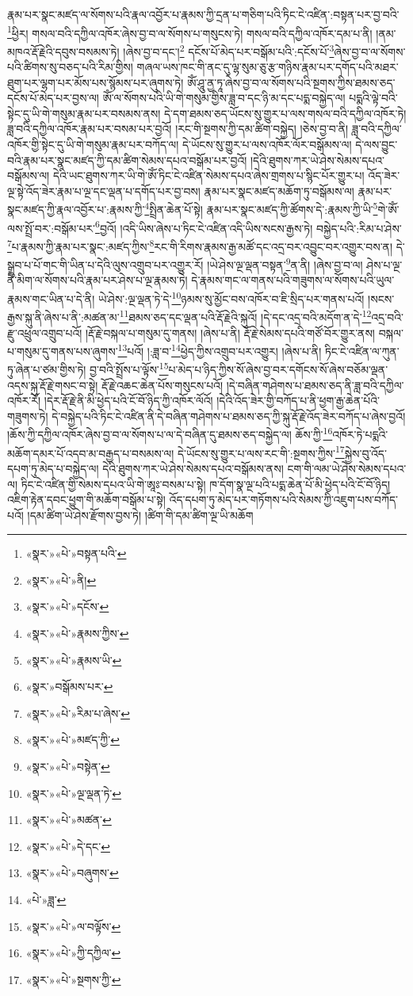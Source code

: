 རྣམ་པར་སྣང་མཛད་ལ་སོགས་པའི་རྣལ་འབྱོར་པ་རྣམས་ཀྱི་དྲན་པ་གཅིག་པའི་ཏིང་ངེ་འཛིན་:བསྟན་པར་བྱ་བའི་\footnote{«སྣར་»«པེ་»བསྟན་པའི་}ཕྱིར། གསལ་བའི་དཀྱིལ་འཁོར་ཞེས་བྱ་བ་ལ་སོགས་པ་གསུངས་ཏེ། གསལ་བའི་དཀྱིལ་འཁོར་དམ་པ་ནི། །ནམ་མཁའ་རྡོ་རྗེའི་དབུས་བསམས་ཏེ། །ཞེས་བྱ་བ་དང་།\footnote{«སྣར་»«པེ་»ནི།} དངོས་པོ་མེད་པར་བསྒོམ་པའི་:དངོས་པོ་\footnote{«སྣར་»«པེ་»དངོས་}ཞེས་བྱ་བ་ལ་སོགས་པའི་ཚིགས་སུ་བཅད་པའི་རིམ་གྱིས། གཞལ་ཡས་ཁང་གི་ནང་དུ་ལྷ་སུམ་ཅུ་རྩ་གཉིས་རྣམ་པར་དགོད་པའི་མཐར་ཐུག་པར་ལྷག་པར་མོས་པས་སྙོམས་པར་ཞུགས་ཏེ། ཨོཾ་ཤཱུ་ནྱ་ཏཱ་ཞེས་བྱ་བ་ལ་སོགས་པའི་སྔགས་ཀྱིས་ཐམས་ཅད་དངོས་པོ་མེད་པར་བྱས་ལ། ཨོཾ་ལ་སོགས་པའི་ཡི་གེ་གསུམ་གྱིས་ཟླ་བ་དང་ཉི་མ་དང་པདྨ་བསྐྱེད་ལ། པདྨའི་ལྟེ་བའི་སྟེང་དུ་ཡི་གེ་གསུམ་རྣམ་པར་བསམས་ནས། དེ་དག་ཐམས་ཅད་ཡོངས་སུ་གྱུར་པ་ལས་གསལ་བའི་དཀྱིལ་འཁོར་ཏེ། ཟླ་བའི་དཀྱིལ་འཁོར་རྣམ་པར་བསམ་པར་བྱའོ། །རང་གི་སྔགས་ཀྱི་དམ་ཚིག་བསྐྱེད། །ཅེས་བྱ་བ་ནི། ཟླ་བའི་དཀྱིལ་འཁོར་གྱི་སྟེང་དུ་ཡི་གེ་གསུམ་རྣམ་པར་བཀོད་ལ། དེ་ཡོངས་སུ་གྱུར་པ་ལས་འཁོར་ལོར་བསྒོམས་ལ། དེ་ལས་བྱུང་བའི་རྣམ་པར་སྣང་མཛད་ཀྱི་དམ་ཚིག་སེམས་དཔའ་བསྒོམ་པར་བྱའོ། །དེའི་ཐུགས་ཀར་ཡེ་ཤེས་སེམས་དཔའ་བསྒོམས་ལ། དེའི་ཡང་ཐུགས་ཀར་ཡི་གེ་ཨོཾ་ཏིང་ངེ་འཛིན་སེམས་དཔའ་ཞེས་གྲགས་པ་སྙིང་པོར་གྱུར་པ། འོད་ཟེར་ལྔ་སྟེ་འོད་ཟེར་རྣམ་པ་ལྔ་དང་ལྡན་པ་དགོད་པར་བྱ་བས། རྣམ་པར་སྣང་མཛད་མཆོག་ཏུ་བསྒོམས་ལ། རྣམ་པར་སྣང་མཛད་ཀྱི་རྣལ་འབྱོར་པ་:རྣམས་ཀྱི་\footnote{«སྣར་»«པེ་»རྣམས་ཀྱིས་}སྤྲིན་ཆེན་པོ་སྟེ། རྣམ་པར་སྣང་མཛད་ཀྱི་ཚོགས་དེ་:རྣམས་ཀྱི་ཡི་\footnote{«སྣར་»«པེ་»རྣམས་ཡི་}གེ་ཨོཾ་ལས་སྤྲོ་བར་:བསྒོམ་པར་\footnote{«སྣར་»བསྒོམས་པར་}བྱའོ། །འདི་ཡིས་ཞེས་པ་ཏིང་ངེ་འཛིན་འདི་ཡིས་སངས་རྒྱས་ཏེ། བསྐྱེད་པའི་:རིམ་པ་ཤེས་\footnote{«སྣར་»«པེ་»རིམ་པ་ཞེས་}པ་རྣམས་ཀྱི་རྣམ་པར་སྣང་:མཛད་ཀྱིས་\footnote{«སྣར་»«པེ་»མཛད་ཀྱི་}རང་གི་རིགས་རྣམས་རྒྱ་མཚོ་དང་འདྲ་བར་འབྱུང་བར་འགྱུར་བས་ན། དེ་སྒྲུབ་པ་པོ་གང་གི་ཡིན་པ་དེའི་ལུས་འགྲུབ་པར་འགྱུར་རོ། །ཡེ་ཤེས་ལྔ་ལྡན་བསྟན་\footnote{«སྣར་»«པེ་»བསྟེན་}ན་ནི། །ཞེས་བྱ་བ་ལ། ཤེས་པ་ལྔ་ནི་མིག་ལ་སོགས་པའི་རྣམ་པར་ཤེས་པ་ལྔ་རྣམས་ཏེ། དེ་རྣམས་གང་ལ་གནས་པའི་གཟུགས་ལ་སོགས་པའི་ཡུལ་རྣམས་གང་ཡིན་པ་དེ་ནི། ཡེ་ཤེས་:ལྔ་ལྡན་ཏེ་དེ་\footnote{«སྣར་»«པེ་»ལྔ་ལྡན་ཏེ་}ཉམས་སུ་མྱོང་བས་འཁོར་བ་ཇི་སྲིད་པར་གནས་པའོ། །སངས་རྒྱས་སྐུ་ནི་ཞེས་པ་ནི་:མཚན་མ་\footnote{«སྣར་»«པེ་»མཚན་}ཐམས་ཅད་དང་ལྡན་པའི་རྡོ་རྗེའི་སྐུའོ། །དེ་དང་འདྲ་བའི་མདོག་ན་དེ་\footnote{«སྣར་»«པེ་»དེ་དང་}འདྲ་བའི་རྫུ་འཕྲུལ་འགྲུབ་པའོ། །རྡོ་རྗེ་བསྐལ་པ་གསུམ་དུ་གནས། །ཞེས་པ་ནི། རྡོ་རྗེ་སེམས་དཔའི་གཙོ་བོར་གྱུར་ནས། བསྐལ་པ་གསུམ་དུ་གནས་པས་ཞུགས་\footnote{«སྣར་»«པེ་»བཞུགས་}པའོ། །:ཟླ་བ་\footnote{«པེ་»ཟླ་}ཕྱེད་ཀྱིས་འགྲུབ་པར་འགྱུར། །ཞེས་པ་ནི། ཏིང་ངེ་འཛིན་ལ་ཀུན་ཏུ་ཞེན་པ་ཙམ་གྱིས་ཏེ། བྱ་བའི་སྤྲོས་པ་ལྟོས་\footnote{«སྣར་»«པེ་»ལ་བལྟོས་}པ་མེད་པ་ཉིད་ཀྱིས་སོ་ཞེས་བྱ་བར་དགོངས་སོ་ཞེས་བཅོམ་ལྡན་འདས་སྐུ་རྡོ་རྗེ་གསང་བ་སྟེ། རྡོ་རྗེ་འཆང་ཆེན་པོས་གསུངས་པའོ། །དེ་བཞིན་གཤེགས་པ་ཐམས་ཅད་ནི་ཟླ་བའི་དཀྱིལ་འཁོར་རོ། །དེར་རྡོ་རྗེ་ནི་མི་ཕྱེད་པའི་ངོ་བོ་ཉིད་ཀྱི་འཁོར་ལོའོ། །དེའི་འོད་ཟེར་གྱི་བཀོད་པ་ནི་ཕྱག་རྒྱ་ཆེན་པོའི་གཟུགས་ཏེ། དེ་བསྐྱེད་པའི་ཏིང་ངེ་འཛིན་ནི་དེ་བཞིན་གཤེགས་པ་ཐམས་ཅད་ཀྱི་སྐུ་རྡོ་རྗེ་འོད་ཟེར་བཀོད་པ་ཞེས་བྱའོ། །ཆོས་ཀྱི་དཀྱིལ་འཁོར་ཞེས་བྱ་བ་ལ་སོགས་པ་ལ་དེ་བཞིན་དུ་ཐམས་ཅད་བསྐྱེད་ལ། ཆོས་ཀྱི་\footnote{«སྣར་»«པེ་»ཀྱི་དཀྱིལ་}འཁོར་ཏེ་པདྨའི་མཆོག་དམར་པོ་འདབ་མ་བརྒྱད་པ་བསམས་ལ། དེ་ཡོངས་སུ་གྱུར་པ་ལས་རང་གི་:སྔགས་ཀྱིས་\footnote{«སྣར་»«པེ་»སྔགས་ཀྱི་}སྐྱེས་བུ་འོད་དཔག་ཏུ་མེད་པ་བསྐྱེད་ལ། དེའི་ཐུགས་ཀར་ཡེ་ཤེས་སེམས་དཔའ་བསྒོམས་ནས། ངག་གི་ལམ་ཡེ་ཤེས་སེམས་དཔའ་ལ། ཏིང་ངེ་འཛིན་གྱི་སེམས་དཔའ་ཡི་གེ་ཨཱཿ་བསམ་པ་སྟེ། ཁ་དོག་སྣ་ལྔ་པའི་པདྨ་ཆེན་པོ་མི་ཕྱེད་པའི་ངོ་བོ་ཉིད། འཇིག་རྟེན་དབང་ཕྱུག་གི་མཆོག་བསྒོམ་པ་སྟེ། འོད་དཔག་ཏུ་མེད་པར་གཏོགས་པའི་སེམས་ཀྱི་འཇུག་པས་བཀོད་པའོ། །དམ་ཚིག་ཡེ་ཤེས་རྫོགས་བྱས་ཏེ། །ཚིག་གི་དམ་ཚིག་ལྔ་ཡི་མཆོག 